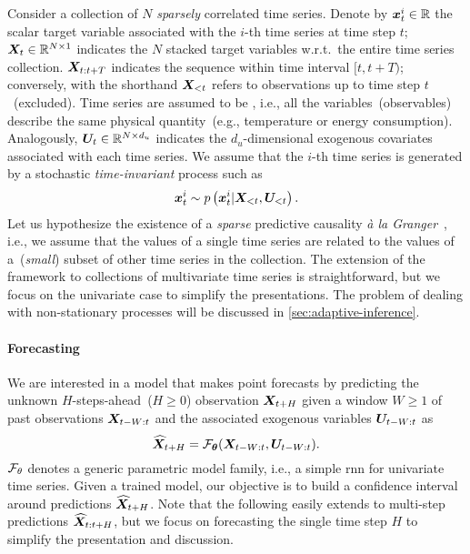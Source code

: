 Consider a collection of $N$ \textit{sparsely} correlated time series. Denote by ${\bm{x}}^i_t \in {\mathbb{R}}$ the scalar target variable associated with the $i$-th time series at time step $t$; ${\bm{X}}_t \in {\mathbb{R}}^{N\times 1}$ indicates the $N$ stacked target variables w.r.t.\ the entire time series collection. ${\bm{X}}_{t:t+T}$ indicates the sequence within time interval $[t, t+T)$; conversely, with the shorthand ${\bm{X}}_{<t}$ refers to observations up to time step $t$~(excluded). Time series are assumed to be , i.e., all the variables~(observables) describe the same physical quantity~(e.g., temperature or energy consumption). Analogously, ${\bm{U}}_t \in {\mathbb{R}}^{N \times d_u}$ indicates the $d_u$-dimensional exogenous covariates associated with each time series. 
We assume that the $i$-th time series is generated by a stochastic \textit{time-invariant} process such as
\begin{equation}
    {\bm{x}}_t^i \sim p\left({\bm{x}}_{t}^i | {\bm{X}}_{<t}, {\bm{U}}_{< t}\right).
\end{equation}
Let us hypothesize the existence of a \textit{sparse} predictive causality \textit{\`a la Granger}~\citep{granger1969investigating}, i.e., 
we assume that the values of a single time series are related to the values of a~(\textit{small}) subset of other time series in the collection. The extension of the framework to collections of multivariate time series is straightforward, but we focus on the univariate case to simplify the presentations. {The problem of dealing with non-stationary processes will be discussed in \autoref{sec:adaptive-inference}}.

\paragraph{Forecasting} We are interested in a model that makes point forecasts by predicting the unknown $H$-steps-ahead~($H\geq 0$) observation ${\bm{X}}_{t+H}$ given a window $W \geq 1$ of past observations ${\bm{X}}_{t-W:t}$ and the associated exogenous variables ${\bm{U}}_{t-W:t}$ as
\begin{equation}
    \widehat {{\bm{X}}}_{t+H} = {\mathcal{F}}_{\bm{\theta}}({\bm{X}}_{t-W:t}, {\bm{U}}_{t-W:t}).
\end{equation}
${\mathcal{F}}_\theta$ denotes a generic parametric model family, i.e., a simple \gls{rnn} for univariate time series.
Given a trained model, our objective is to build a confidence interval around predictions $\widehat {{\bm{X}}}_{t+H}$. Note that the following easily extends to multi-step predictions $\widehat {{\bm{X}}}_{t:t+H}$, but we focus on forecasting the single time step $H$ to simplify the presentation and discussion.


